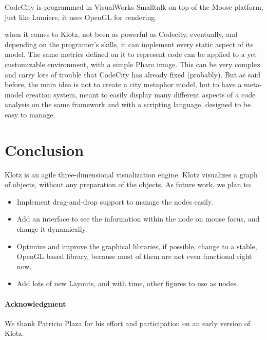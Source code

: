\documentclass{sig-alternate}
\newcommand{\seclabel}[1]{\label{sec:#1}}
\begin{document}
CodeCity is programmed in VisualWorks Smalltalk on top of the Moose 
platform, just like Lumiere, it uses OpenGL for rendering.

when it comes to Klotz, not been as powerful as Codecity, eventually, 
and depending on the programer's skills, it can implement every static 
aspect of its model. The same metrics defined on it to represent code 
can be applied to a yet customizable environment, with a simple Pharo image. 
This can be very complex and carry lots of trouble that CodeCity has 
already fixed (probably). But as said before, the main idea is not to 
create a city metaphor model, but to have a meta-model creation system, 
meant to easily display many different aspects of a code analysis on the 
same framework and with a scripting language, designed to be easy to manage.


\section{Conclusion} \seclabel{conclusion}

Klotz is an agile three-dimensional visualization engine. Klotz visualizes a graph of objects, without any preparation of the objects.
As future work, we plan to:
\begin{itemize}
\item Implement drag-and-drop support to manage the nodes easily.
\item Add an interface to see the information within the node on mouse focus, and change it dynamically.
\item Optimize and improve the graphical libraries, if possible, change to a stable, OpenGL based library, because most of them are not even functional right now. 
\item Add lots of new Layouts, and with time, other figures to use as nodes. 
\end{itemize}

\paragraph{Acknowledgment} 
We thank Patricio Plaza for his effort and participation on an early version of Klotz.

%



\end{document}
